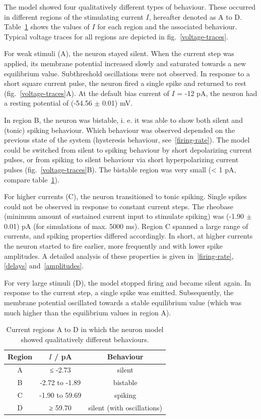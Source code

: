 \documentclass[12pt,a4paper,]{report}
\begin{document}
The model showed four qualitatively different types of behaviour. These
occurred in different regions of the stimulating current $I$, hereafter
denoted as A to D. Table~\ref{regions} shows the values of $I$ for each
region and the associated behaviour. Typical voltage traces for all
regions are depicted in fig.~\ref{voltage-traces}.

For weak stimuli (A), the neuron stayed silent. When the current step
was applied, its membrane potential increased slowly and saturated
towards a new equilibrium value. Subthreshold oscillations were not
observed. In response to a short square current pulse, the neuron fired
a single spike and returned to rest (fig.~\ref{voltage-traces}A). At the
default bias current of $I$ = -12 pA, the neuron had a resting potential
of (-54.56 $\pm$ 0.01) mV.

In region B, the neuron was bistable, i. e. it was able to show both
silent and (tonic) spiking behaviour. Which behaviour was observed
depended on the previous state of the system (hysteresis behaviour,
see~\ref{firing-rate}). The model could be switched from silent to
spiking behaviour by short depolarizing current pulses, or from spiking
to silent behaviour via short hyperpolarizing current pulses
(fig.~\ref{voltage-traces}B). The bistable region was very small
(\textless{} 1 pA, compare table~\ref{regions}).

For higher currents (C), the neuron transitioned to tonic spiking.
Single spikes could not be observed in response to constant current
steps. The rheobase (minimum amount of sustained current input to
stimulate spiking) was (-1.90 $\pm$ 0.01) pA (for simulations of max.
5000 ms). Region C spanned a large range of currents, and spiking
properties differed accordingly. In short, at higher currents the neuron
started to fire earlier, more frequently and with lower spike
amplitudes. A detailed analysis of these properties is given
in~\ref{firing-rate}, \ref{delays} and~\ref{amplitudes}.

For very large stimuli (D), the model stopped firing and became silent
again. In response to the current step, a single spike was emitted.
Subsequently, the membrane potential oscillated towards a stable
equilibrium value (which was much higher than the equilibrium values in
region A).

\begin{table}
\centering
\begin{tabular}{ccc}
\toprule\addlinespace
Region & $I$ / pA & Behaviour\tabularnewline
\midrule
A & ≤ -2.73 & silent\tabularnewline
B & -2.72 to -1.89 & bistable\tabularnewline
C & -1.90 to 59.69 & spiking\tabularnewline
D & ≥ 59.70 & silent (with oscillations)\tabularnewline
\bottomrule
\end{tabular}
\caption[Current regions A to D]{Current regions A to D in which the neuron model showed
qualitatively different behaviours.}\label{regions}
\end{table}
\end{document}
